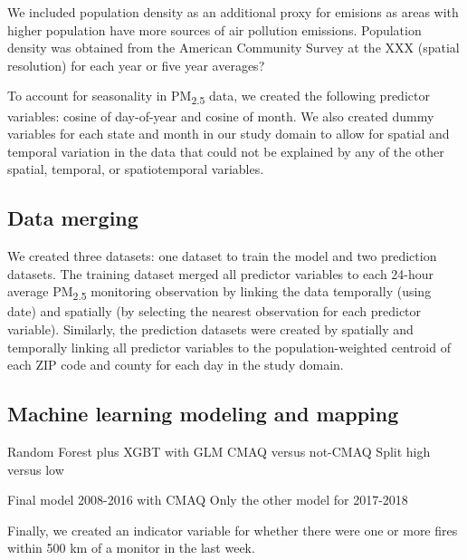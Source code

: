 \documentclass[english]{article}
\begin{document}
We included population density as an additional proxy for emisions as areas with higher population have more sources of air pollution emissions. Population density was obtained from the American Community Survey at the XXX (spatial resolution) for each year or five year averages? 

To account for seasonality in PM\textsubscript{2.5} data, we created the following predictor variables:  cosine of day-of-year and cosine of month. %
We also created dummy variables for each state and month in our study domain to allow for spatial and temporal variation in the data that could not be explained by any of the other spatial, temporal, or spatiotemporal variables. 

\subsection*{Data merging}
We created three datasets: one dataset to train the model and two prediction datasets. The training dataset merged all predictor variables to each 24-hour average PM\textsubscript{2.5} monitoring observation by linking the data temporally (using date) and spatially (by selecting the nearest observation for each predictor variable). Similarly, the prediction datasets were created by spatially and temporally linking all predictor variables to the population-weighted centroid of each ZIP code and county for each day in the study domain. 

\subsection*{Machine learning modeling and mapping}


Random Forest plus XGBT with GLM
CMAQ versus not-CMAQ
Split high versus low

Final model 2008-2016 with CMAQ
Only the other model for 2017-2018

Finally, we created an indicator variable for whether there were one or more fires within 500 km of a monitor in the last week. 
\end{document}
